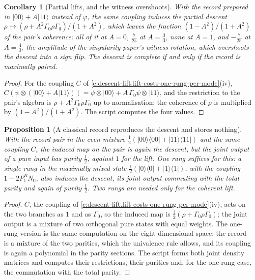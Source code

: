 \documentclass[11pt]{article}
\newtheorem{proposition}[theorem]{Proposition}
\newtheorem{corollary}[theorem]{Corollary}
\theoremstyle{definition}
\theoremstyle{plain}
\providecommand{\G}{}\renewcommand{\G}{\Gamma}
\providecommand{\bra}{}\renewcommand{\bra}[1]{\langle #1|}
\providecommand{\ket}{}\renewcommand{\ket}[1]{|#1\rangle}
\begin{document}
\begin{corollary}[Partial lifts, and the witness overshoots]\label{c:descent-lift.partial-lifts-witness-overshoots}
With the record prepared in $\ket{00} + A\ket{11}$ instead of $\varphi$, the same coupling induces the partial descent $\rho \mapsto (\rho + A^{2}\G_{0}\rho\G_{0})/(1 + A^{2})$, which leaves the fraction $(1 - A^{2})/(1 + A^{2})$ of the pair's coherence: all of it at $A = 0$, $\tfrac{7}{25}$ at $A = \tfrac34$, none at $A = 1$, and $-\tfrac{7}{25}$ at $A = \tfrac43$, the amplitude of the singularity paper's witness rotation, which overshoots the descent into a sign flip. The descent is complete if and only if the record is maximally paired.
\end{corollary}
\begin{proof}
For the coupling $C$ of \ref{c:descent-lift.lift-costs-one-rung-per-mode}(iv), $C(\psi \otimes (\ket{00} + A\ket{11})) = \psi\otimes\ket{00} + A\,\G_{0}\psi\otimes\ket{11}$, and the restriction to the pair's algebra is $\rho + A^{2}\G_{0}\rho\G_{0}$ up to normalisation; the coherence of $\rho$ is multiplied by $(1 - A^{2})/(1 + A^{2})$. The script computes the four values.

\end{proof}

\begin{proposition}[A classical record reproduces the descent and stores nothing]\label{c:descent-lift.classical-record-reproduces-descent-stores-nothing}
With the record pair in the even mixture $\tfrac12(\ket{00}\bra{00} + \ket{11}\bra{11})$ and the same coupling $C$, the induced map on the pair is again the descent, but the joint output of a pure input has purity $\tfrac12$, against $1$ for the lift. One rung suffices for this: a single rung in the maximally mixed state $\tfrac12(\ket{0}\bra{0} + \ket{1}\bra{1})$, with the coupling $1 - 2P^{R}_{1}N_{0}$, also induces the descent, its joint output commuting with the total parity and again of purity $\tfrac12$. Two rungs are needed only for the coherent lift.
\end{proposition}
\begin{proof}
$C$, the coupling of \ref{c:descent-lift.lift-costs-one-rung-per-mode}(iv), acts on the two branches as $1$ and as $\G_{0}$, so the induced map is $\tfrac12(\rho + \G_{0}\rho\G_{0})$; the joint output is a mixture of two orthogonal pure states with equal weights. The one-rung version is the same computation on the eight-dimensional space: the record is a mixture of the two parities, which the univalence rule allows, and its coupling is again a polynomial in the parity sections. The script forms both joint density matrices and computes their restrictions, their purities and, for the one-rung case, the commutation with the total parity.

\end{proof}
\end{document}
